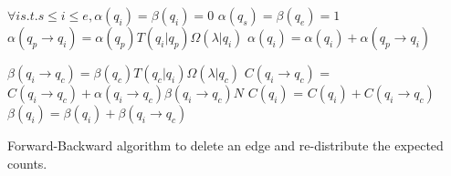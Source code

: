 \documentclass[letterpaper]{article}
\begin{document}
\begin{algorithm}
\footnotesize
\begin{algorithmic}


\State $\forall i s.t. s \leq i \leq e, \alpha(q_i) = \beta(q_i) = 0$
%
   \State $\alpha(q_s) = \beta(q_e) = 1$
      \State  $\alpha(q_p \rightarrow q_i) = \alpha(q_p) T(q_i|q_p) \Omega(\lambda|q_i)$
      \State $\alpha(q_i) = \alpha(q_i) + \alpha(q_p \rightarrow q_i)$
\EndFor
\EndFor

      \State  $\beta(q_i \rightarrow q_c) = \beta(q_c) T(q_c|q_i) \Omega(\lambda|q_c)$
      \State  $C(q_i \rightarrow q_c)$ = $C(q_i \rightarrow q_c) + \alpha(q_i \rightarrow q_c)  \beta(q_i \rightarrow q_c) N$
      \State  $C(q_i)$ = $C(q_i) + C(q_i \rightarrow q_c)$
      \State $\beta(q_i) = \beta(q_i) + \beta(q_i \rightarrow q_c)$
\EndFor
\EndFor
\EndProcedure

\end{algorithmic}
\label{deleteedge}
\caption{Forward-Backward algorithm to delete an edge and re-distribute the expected counts.}
\end{algorithm}


\end{document}
